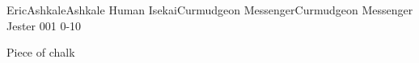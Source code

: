 
\begin{filledCS}%
  {\ifnum{}\ifnum{} Eric\else Ashkale\fi\else Ashkale\fi}%
  {Human}%
  {\ifnum{}\ifnum{} Isekai\else Curmudgeon Messenger\fi\else Curmudgeon Messenger\fi}%
  {Jester}%
  {{0}{0}{1}}%
  {{0}{-1}{0}}%
  {%
    \setcounter{Athletics}{2}
    \setcounter{Stealth}{1}
    \setcounter{Cultivation}{1}

    \setcounter{Melee}{1}
    \addtocounter{equipmentWeight}{-1}
  }%
  {\charge}%
  {Piece of chalk}%

\end{filledCS}

